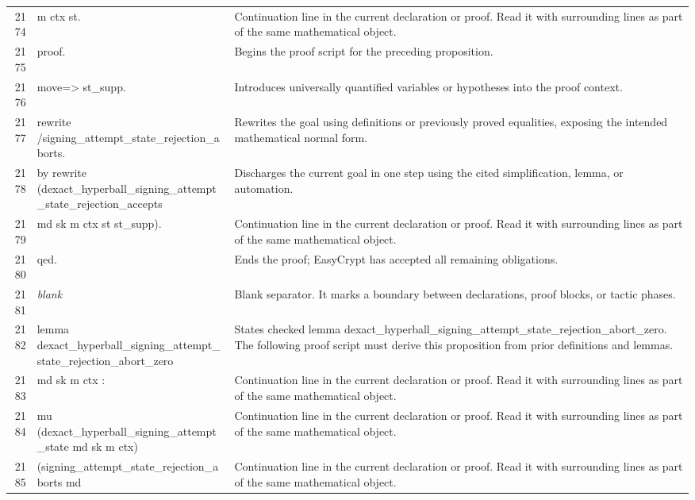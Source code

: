 \documentclass[10pt]{article}
\begin{document}
\begin{longtable}{r L{0.53\textwidth} L{0.37\textwidth}}
2174 & {\ttfamily\scriptsize       m ctx st.} & Continuation line in the current declaration or proof.  Read it with surrounding lines as part of the same mathematical object. \\
2175 & {\ttfamily\scriptsize proof.} & Begins the proof script for the preceding proposition. \\
2176 & {\ttfamily\scriptsize move=> st\_supp.} & Introduces universally quantified variables or hypotheses into the proof context. \\
2177 & {\ttfamily\scriptsize rewrite /signing\_attempt\_state\_rejection\_aborts.} & Rewrites the goal using definitions or previously proved equalities, exposing the intended mathematical normal form. \\
2178 & {\ttfamily\scriptsize by rewrite (dexact\_hyperball\_signing\_attempt\_state\_rejection\_accepts} & Discharges the current goal in one step using the cited simplification, lemma, or automation. \\
2179 & {\ttfamily\scriptsize               md sk m ctx st st\_supp).} & Continuation line in the current declaration or proof.  Read it with surrounding lines as part of the same mathematical object. \\
2180 & {\ttfamily\scriptsize qed.} & Ends the proof; EasyCrypt has accepted all remaining obligations. \\
2181 & {\ttfamily\scriptsize \emph{blank}} & Blank separator.  It marks a boundary between declarations, proof blocks, or tactic phases. \\
2182 & {\ttfamily\scriptsize lemma dexact\_hyperball\_signing\_attempt\_state\_rejection\_abort\_zero} & States checked lemma dexact\_hyperball\_signing\_attempt\_state\_rejection\_abort\_zero.  The following proof script must derive this proposition from prior definitions and lemmas. \\
2183 & {\ttfamily\scriptsize   md sk m ctx :} & Continuation line in the current declaration or proof.  Read it with surrounding lines as part of the same mathematical object. \\
2184 & {\ttfamily\scriptsize   mu (dexact\_hyperball\_signing\_attempt\_state md sk m ctx)} & Continuation line in the current declaration or proof.  Read it with surrounding lines as part of the same mathematical object. \\
2185 & {\ttfamily\scriptsize     (signing\_attempt\_state\_rejection\_aborts md} & Continuation line in the current declaration or proof.  Read it with surrounding lines as part of the same mathematical object. \\

\end{longtable}
\end{document}
